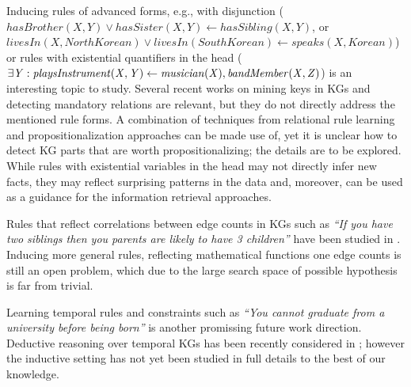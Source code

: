 Inducing rules of  advanced forms, e.g., %
with disjunction (\eg $hasBrother(X,Y) \vee hasSister(X,Y) \leftarrow hasSibling(X,Y)$, or $livesIn(X, North Korean) \vee livesIn(South Korean) \leftarrow speaks(X, Korean) $)    or rules with existential quantifiers in the head (\eg $\mathit{\exists Y: playsInstrument(X, Y) \leftarrow musician(X),bandMember(X,Z)}$) is an interesting topic to study. Several recent works on mining keys in KGs \cite{vickey,DBLP:conf/www/LajusS18} and detecting mandatory relations are relevant, but they do not directly address the mentioned rule forms. A combination of techniques from relational rule learning \cite{DBLP:books/daglib/0021868} and propositionalization approaches \cite{propos} can be made use of, yet it is unclear how to detect KG parts that are worth propositionalizing; the details are to be explored. %
While rules with existential variables in the head may not directly infer new facts, they may reflect surprising patterns in the data and, moreover,  can be used as a guidance for the information retrieval approaches.

Rules that reflect correlations between edge counts in KGs such as \emph{``If you have two siblings then you parents are likely to have 3 children''} have been studied in \cite{carl}. Inducing more general rules, reflecting mathematical functions one edge counts is still an open problem, which due to the large search space of possible hypothesis is far from trivial.

Learning temporal rules and constraints such as \emph{``You cannot graduate from a university before being born''} is another promissing future work direction. Deductive reasoning over temporal KGs has been recently considered in \cite{DBLP:conf/aaai/ChekolPSS17}; however the inductive setting has not yet been studied in full details to the best of our knowledge.

